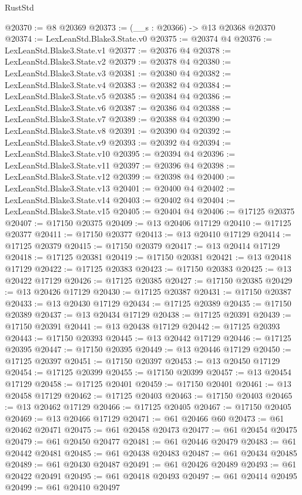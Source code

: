 \begin{lexlean}{RustStd}
\begin{coremodule}
@20370 := @8 @20369
@20373 := (__s : @20366) -> @13 @20368 @20370
@20374 := LexLeanStd.Blake3.State.v0
@20375 := @20374 @4
@20376 := LexLeanStd.Blake3.State.v1
@20377 := @20376 @4
@20378 := LexLeanStd.Blake3.State.v2
@20379 := @20378 @4
@20380 := LexLeanStd.Blake3.State.v3
@20381 := @20380 @4
@20382 := LexLeanStd.Blake3.State.v4
@20383 := @20382 @4
@20384 := LexLeanStd.Blake3.State.v5
@20385 := @20384 @4
@20386 := LexLeanStd.Blake3.State.v6
@20387 := @20386 @4
@20388 := LexLeanStd.Blake3.State.v7
@20389 := @20388 @4
@20390 := LexLeanStd.Blake3.State.v8
@20391 := @20390 @4
@20392 := LexLeanStd.Blake3.State.v9
@20393 := @20392 @4
@20394 := LexLeanStd.Blake3.State.v10
@20395 := @20394 @4
@20396 := LexLeanStd.Blake3.State.v11
@20397 := @20396 @4
@20398 := LexLeanStd.Blake3.State.v12
@20399 := @20398 @4
@20400 := LexLeanStd.Blake3.State.v13
@20401 := @20400 @4
@20402 := LexLeanStd.Blake3.State.v14
@20403 := @20402 @4
@20404 := LexLeanStd.Blake3.State.v15
@20405 := @20404 @4
@20406 := @17125 @20375
@20407 := @17150 @20375
@20409 := @13 @20406 @17129
@20410 := @17125 @20377
@20411 := @17150 @20377
@20413 := @13 @20410 @17129
@20414 := @17125 @20379
@20415 := @17150 @20379
@20417 := @13 @20414 @17129
@20418 := @17125 @20381
@20419 := @17150 @20381
@20421 := @13 @20418 @17129
@20422 := @17125 @20383
@20423 := @17150 @20383
@20425 := @13 @20422 @17129
@20426 := @17125 @20385
@20427 := @17150 @20385
@20429 := @13 @20426 @17129
@20430 := @17125 @20387
@20431 := @17150 @20387
@20433 := @13 @20430 @17129
@20434 := @17125 @20389
@20435 := @17150 @20389
@20437 := @13 @20434 @17129
@20438 := @17125 @20391
@20439 := @17150 @20391
@20441 := @13 @20438 @17129
@20442 := @17125 @20393
@20443 := @17150 @20393
@20445 := @13 @20442 @17129
@20446 := @17125 @20395
@20447 := @17150 @20395
@20449 := @13 @20446 @17129
@20450 := @17125 @20397
@20451 := @17150 @20397
@20453 := @13 @20450 @17129
@20454 := @17125 @20399
@20455 := @17150 @20399
@20457 := @13 @20454 @17129
@20458 := @17125 @20401
@20459 := @17150 @20401
@20461 := @13 @20458 @17129
@20462 := @17125 @20403
@20463 := @17150 @20403
@20465 := @13 @20462 @17129
@20466 := @17125 @20405
@20467 := @17150 @20405
@20469 := @13 @20466 @17129
@20471 := @61 @20466 @60
@20473 := @61 @20462 @20471
@20475 := @61 @20458 @20473
@20477 := @61 @20454 @20475
@20479 := @61 @20450 @20477
@20481 := @61 @20446 @20479
@20483 := @61 @20442 @20481
@20485 := @61 @20438 @20483
@20487 := @61 @20434 @20485
@20489 := @61 @20430 @20487
@20491 := @61 @20426 @20489
@20493 := @61 @20422 @20491
@20495 := @61 @20418 @20493
@20497 := @61 @20414 @20495
@20499 := @61 @20410 @20497

\end{coremodule}
\end{lexlean}
